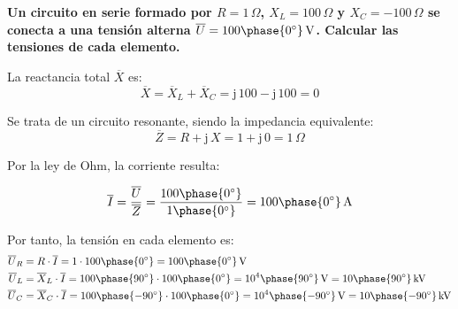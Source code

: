 \vspace{4mm}
\begin{example}\label{ej.2-4}
  \textbf{Un circuito en serie formado por $R=1\,\Omega$,
    ${X_L}=100\,\Omega$ y ${X_C}=-100\,\Omega$ se conecta a una
    tensión alterna
    $\overline{U}=100\phase{0^\circ}\,\si{\volt}$. Calcular las
    tensiones de cada elemento.}

  \vspace{4mm} La reactancia total $\overline{X}$ es:
  \begin{equation*}
    \overline{X}= \overline{X}_L+\overline{X}_C=\mathrm{j}\,100-\mathrm{j}\,100=0
  \end{equation*}
		
  Se trata de un circuito resonante, siendo la impedancia equivalente:
  \begin{equation*}
    \overline{Z}=R+\mathrm{j}\,X=1+\mathrm{j}\,0=1\,\Omega
  \end{equation*}
		
  Por la ley de Ohm, la corriente resulta:

  \vspace{-2mm}
  \begin{equation*}
    \overline{I}=\dfrac{\overline{U}}{\overline{Z}}=\dfrac{100\phase{0^\circ}}{1\phase{0^\circ}}=100\phase{0^\circ}\,\si{\ampere}
  \end{equation*}
		
  Por tanto, la tensión en cada elemento es:
  \begin{align*}
    \overline{U}_R&=R\cdot\overline{I}=1\cdot 100\phase{0^\circ}=100\phase{0^\circ}\,\si{\volt}\\
    \overline{U}_L&=\overline{X}_L\cdot\overline{I}=100\phase{90^\circ}\cdot 100\phase{0^\circ}=10^4\phase{90^\circ}\,\si{\volt}=10\phase{90^\circ}\,\si{\kilo\volt}\\
    \overline{U}_C&=\overline{X}_C\cdot\overline{I}=100\phase{-90^\circ}\cdot 100\phase{0^\circ}=10^4\phase{-90^\circ}\,\si{\volt}=10\phase{-90^\circ}\,\si{\kilo\volt}
  \end{align*}
\end{example}
	
	
